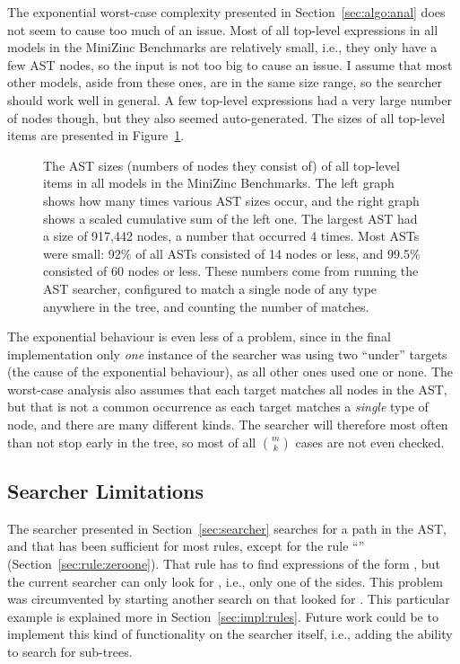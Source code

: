 \documentclass[a4paper,12pt]{article}
\newcommand{\ruleref}[1]{``\nameref{sec:rule:#1}'' (Section~\ref{sec:rule:#1})}
\begin{document}
The exponential
worst-case complexity presented in Section~\ref{sec:algo:anal} does not seem to cause too much
of an issue. Most of all top-level expressions in all models in the MiniZinc Benchmarks are
relatively small, i.e., they only have a few AST nodes,
so the input is not too big to cause an issue. I assume that most other models, aside from these ones, are in the same size range, so the searcher should work well in general.
A few top-level expressions had a very large number
of nodes though, but they also seemed auto-generated.
The sizes of all top-level items are presented in Figure~\ref{fig:ast:counts}.

\begin{figure}[t]
  \centering
  
  \caption{The AST sizes (numbers of nodes they consist of) of all top-level items in all models in the MiniZinc
    Benchmarks. The left graph
    shows how many times various AST sizes occur, and the right graph shows a scaled
    cumulative sum of the left one. The largest AST had a size of 917,442 nodes, a number that occurred 4
    times. Most ASTs were small: 92\% of all ASTs consisted of 14 nodes or less, and
    99.5\% consisted of 60 nodes or less. These numbers come from running the AST
    searcher, configured to match a single node of any type anywhere in the tree, and
    counting the number of matches.}%
  \label{fig:ast:counts}
\end{figure}

The exponential behaviour is even less of a problem, since in the final implementation
only \emph{one} instance of the searcher was using two ``under'' targets (the cause of the
exponential behaviour), as all other ones used one or none. The worst-case analysis also
assumes that each target matches all nodes in the AST, but that is not a common
occurrence as each target matches a \emph{single} type of node, and there are many
different kinds. The searcher will therefore most often than not stop early in the tree,
so most of all $\binom{m}{k}$ cases are not even checked.

\subsection{Searcher Limitations}\label{sec:discussion:srchlimits}
The searcher presented in Section~\ref{sec:searcher} searches for a path in the AST, and
that has been sufficient for most rules, except for the rule \ruleref{zeroone}.
That rule has to find expressions of the form , but the current
searcher can only look for , i.e., only one of the sides. This problem was
circumvented by starting another search on  that looked for .
This particular example is
explained more in Section~\ref{sec:impl:rules}. Future work could be to implement this kind
of functionality on the searcher itself, i.e., adding the ability to search for sub-trees.
\end{document}
